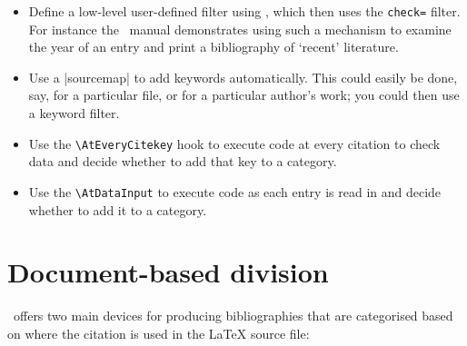 \begin{itemize}
\item Define a low-level user-defined filter using
  , which then uses the
  \texttt{check=} filter. For instance the \biblatex\
  manual demonstrates using such a mechanism to
  examine the year of an entry and print a bibliography of `recent'
  literature.
\item Use a |sourcemap| to add keywords automatically. This could easily be done, say,
  for a particular file, or for a particular author's work; you could
  then use a keyword filter.
\item Use the
  \texttt{\textbackslash{}AtEveryCitekey} hook to execute code at
  every citation to check data and decide whether to add that key to a
  category.\csindex{AtEveryCitekey}
\item Use the \texttt{\textbackslash{}AtDataInput}
  to execute code as each entry is read in and decide whether to add
  it to a category.
\end{itemize}

\section{Document-based division}

\biblatex\ offers two main devices for producing bibliographies that are
categorised based on where the citation is used in the LaTeX source
file:


